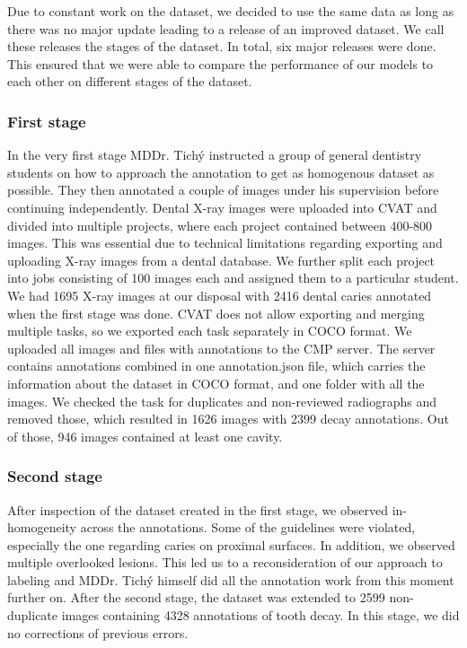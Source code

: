 Due to constant work on the dataset, we decided to use the same data as long as there was no major update leading to a release of an improved dataset. We call these releases the stages of the dataset. In total, six major releases were done. This ensured that we were able to compare the performance of our models to each other on different stages of the dataset. 

\subsubsection{First stage}
In the very first stage MDDr. Tichý instructed a group of general dentistry students on how to approach the annotation to get as homogenous dataset as possible. They then annotated a couple of images under his supervision before continuing independently.
Dental X-ray images were uploaded into CVAT and divided into multiple projects, where each project contained between 400-800 images. This was essential due to technical limitations regarding exporting and uploading X-ray images from a dental database. We further split each project into jobs consisting of 100 images each and assigned them to a particular student. We had 1695 X-ray images at our disposal with 2416 dental caries annotated when the first stage was done.
CVAT does not allow exporting and merging multiple tasks, so we exported each task separately in COCO format. We uploaded all images and files with annotations  to the CMP server. The server contains annotations combined in one annotation.json file, which carries the information about the dataset in COCO format, and one folder with all the images. We checked the task for duplicates and non-reviewed radiographs and removed those, which resulted in 1626 images with 2399 decay annotations. Out of those, 946 images contained at least one cavity.


\subsubsection{Second stage}
After inspection of the dataset created in the first stage, we observed in-homogeneity across the annotations. Some of the guidelines were violated, especially the one regarding caries on proximal surfaces. In addition, we observed multiple overlooked lesions. This led us to a reconsideration of our approach to labeling and MDDr. Tichý himself did all the annotation work from this moment further on. After the second stage, the dataset was extended to 2599 non-duplicate images containing 4328 annotations of tooth decay. In this stage, we did no corrections of previous errors.

